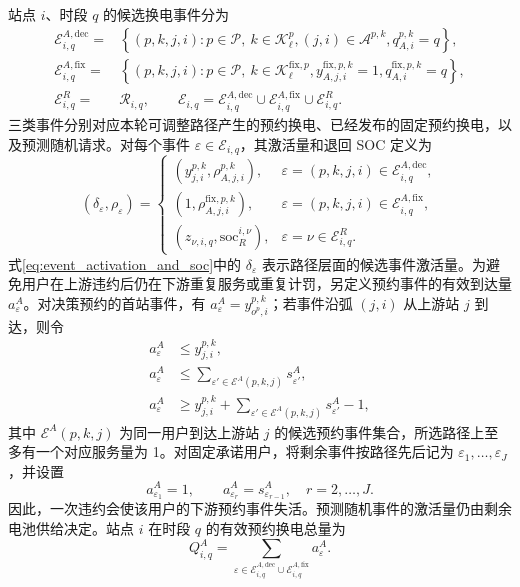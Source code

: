 \documentclass[12pt,a4paper,UTF8]{ctexart}
\begin{document}
站点 $i$、时段 $q$ 的候选换电事件分为
\begin{align}
\mathcal E_{i,q}^{A,\mathrm{dec}}
={}&\left\{(p,k,j,i):p\in\mathcal P,\ k\in\mathcal K_\ell^p,
(j,i)\in\mathcal A^{p,k},
q_{A,i}^{p,k}=q\right\},\\
\mathcal E_{i,q}^{A,\mathrm{fix}}
={}&\left\{(p,k,j,i):p\in\mathcal P,\ k\in\mathcal K_\ell^{\mathrm{fix},p},
y_{A,j,i}^{\mathrm{fix},p,k}=1,
q_{A,i}^{\mathrm{fix},p,k}=q\right\},\\
\mathcal E_{i,q}^{R}
={}&\mathcal R_{i,q},\qquad
\mathcal E_{i,q}
=\mathcal E_{i,q}^{A,\mathrm{dec}}
\cup\mathcal E_{i,q}^{A,\mathrm{fix}}
\cup\mathcal E_{i,q}^{R}.
\label{eq:swap_event_sets}
\end{align}
三类事件分别对应本轮可调整路径产生的预约换电、已经发布的固定预约换电，以及预测随机请求。对每个事件
$\varepsilon\in\mathcal E_{i,q}$，其激活量和退回 SOC 定义为
\begin{equation}
(\delta_\varepsilon,\rho_\varepsilon)=
\begin{cases}
(y_{j,i}^{p,k},\rho_{A,j,i}^{p,k}),
&\varepsilon=(p,k,j,i)\in\mathcal E_{i,q}^{A,\mathrm{dec}},\\
(1,\rho_{A,j,i}^{\mathrm{fix},p,k}),
&\varepsilon=(p,k,j,i)\in\mathcal E_{i,q}^{A,\mathrm{fix}},\\
(z_{\nu,i,q},\mathrm{soc}_{R}^{i,\nu}),
&\varepsilon=\nu\in\mathcal E_{i,q}^{R}.
\end{cases}
\label{eq:event_activation_and_soc}
\end{equation}
式\eqref{eq:event_activation_and_soc}中的 $\delta_\varepsilon$ 表示路径层面的候选事件激活量。为避免用户在上游违约后仍在下游重复服务或重复计罚，另定义预约事件的有效到达量 $a_\varepsilon^A$。对决策预约的首站事件，有 $a_\varepsilon^A=y_{o^p,i}^{p,k}$；若事件沿弧 $(j,i)$ 从上游站 $j$ 到达，则令
\begin{subequations}
\label{eq:reservation_alive_chain_dec}
\begin{align}
a_\varepsilon^A&\le y_{j,i}^{p,k},\\
a_\varepsilon^A&\le
\sum_{\varepsilon'\in\mathcal E^A(p,k,j)}s_{\varepsilon'}^A,\\
a_\varepsilon^A&\ge y_{j,i}^{p,k}
+\sum_{\varepsilon'\in\mathcal E^A(p,k,j)}s_{\varepsilon'}^A-1,
\end{align}
\end{subequations}
其中 $\mathcal E^A(p,k,j)$ 为同一用户到达上游站 $j$ 的候选预约事件集合，所选路径上至多有一个对应服务量为 1。对固定承诺用户，将剩余事件按路径先后记为 $\varepsilon_1,\ldots,\varepsilon_J$，并设置
\begin{equation}
a_{\varepsilon_1}^A=1,
\qquad
a_{\varepsilon_r}^A=s_{\varepsilon_{r-1}}^A,
\quad r=2,\ldots,J.
\label{eq:reservation_alive_chain_fix}
\end{equation}
因此，一次违约会使该用户的下游预约事件失活。预测随机事件的激活量仍由剩余电池供给决定。站点 $i$ 在时段 $q$ 的有效预约换电总量为
\begin{equation}
Q_{i,q}^{A}
=
\sum_{\varepsilon\in
\mathcal E_{i,q}^{A,\mathrm{dec}}
\cup\mathcal E_{i,q}^{A,\mathrm{fix}}}
a_\varepsilon^A.
\label{eq:total_reservation_swap}
\end{equation}
\end{document}
